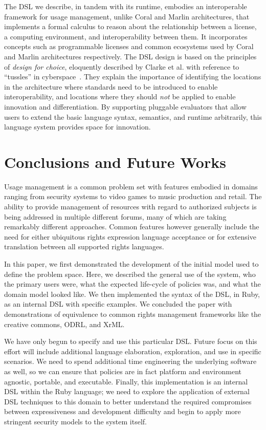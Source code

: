 \documentclass{acm_proc_article-sp}
\begin{document}
The DSL we describe, in tandem with its runtime, embodies an interoperable framework for usage management, unlike Coral and Marlin architectures, that implements a formal calculus to reason about the relationship between a license, a computing environment, and interoperability between them. It incorporates concepts such as programmable licenses and common ecosystems used by Coral and Marlin architectures respectively. The DSL design is based on the principles of {\em design for choice}, eloquently described by Clarke et al. with reference to ``tussles'' in cyberspace~\cite{ClWrSoBr:02}. They explain the importance of identifying the locations in the architecture where standards need to be introduced to enable interoperability, and locations where they should {\em not} be applied to enable innovation and differentiation.  By supporting pluggable evaluators that allow users to extend the basic language syntax, semantics, and runtime arbitrarily, this language system provides space for innovation.

\section{Conclusions and Future Works}
Usage management is a common problem set with features embodied in domains ranging from security systems to video games to music production and retail.  The ability to provide management of resources with regard to authorized subjects is being addressed in multiple different forums, many of which are taking remarkably different approaches.  Common features however generally include the need for either ubiquitous rights expression language acceptance or for extensive translation between all supported rights languages.

In this paper, we first demonstrated the development of the initial model used to define the problem space.  Here, we described the general use of the system, who the primary users were, what the expected life-cycle of policies was, and what the domain model looked like.  We then implemented the syntax of the DSL, in Ruby, as an internal DSL with specific examples.  We concluded the paper with demonstrations of equivalence to common rights management frameworks like the creative commons, ODRL, and XrML.

We have only begun to specify and use this particular DSL.  Future focus on this effort will include additional language elaboration, exploration, and use in specific scenarios.  We need to spend additional time engineering the underlying software as well, so we can ensure that policies are in fact platform and environment agnostic, portable, and executable.  Finally, this implementation is an internal DSL within the Ruby language; we need to explore the application of external DSL techniques to this domain to better understand the required compromises between expressiveness and development difficulty and begin to apply more stringent security models to the system itself.



\end{document}
